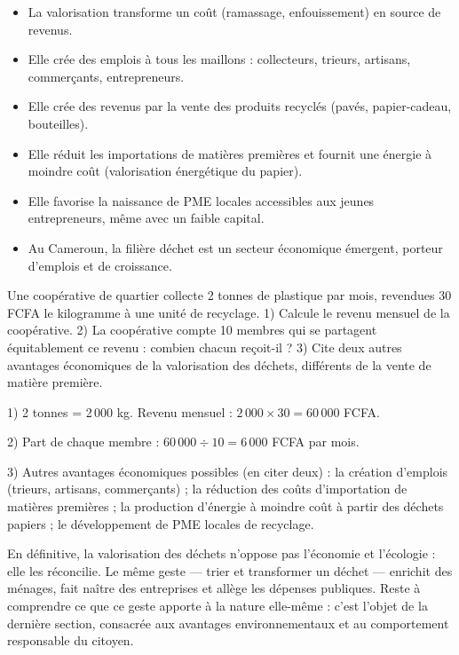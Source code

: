 \documentclass[11pt]{article}
\newcommand{\cle}[1]{{\popxbold\color{popdark}#1}}
\begin{document}
\begin{aretenir}
\begin{itemize}
\item La valorisation transforme un \cle{coût} (ramassage, enfouissement) en \cle{source de revenus}.
\item Elle crée des \cle{emplois} à tous les maillons : collecteurs, trieurs, artisans, commerçants, entrepreneurs.
\item Elle crée des \cle{revenus} par la vente des produits recyclés (pavés, papier-cadeau, bouteilles).
\item Elle réduit les \cle{importations} de matières premières et fournit une \cle{énergie à moindre coût} (valorisation énergétique du papier).
\item Elle favorise la naissance de \cle{PME locales} accessibles aux jeunes entrepreneurs, même avec un faible capital.
\item Au Cameroun, la filière déchet est un \cle{secteur économique émergent}, porteur d'emplois et de croissance.
\end{itemize}
\end{aretenir}

\begin{exercice}
Une coopérative de quartier collecte 2 tonnes de plastique par mois, revendues 30 FCFA le kilogramme à une unité de recyclage. 1) Calcule le revenu mensuel de la coopérative. 2) La coopérative compte 10 membres qui se partagent équitablement ce revenu : combien chacun reçoit-il ? 3) Cite deux autres avantages économiques de la valorisation des déchets, différents de la vente de matière première.
\end{exercice}

\begin{corrige}
1) 2 tonnes = 2\,000 kg. Revenu mensuel : $2\,000 \times 30 = 60\,000$ FCFA.

2) Part de chaque membre : $60\,000 \div 10 = 6\,000$ FCFA par mois.

3) Autres avantages économiques possibles (en citer deux) : la création d'emplois (trieurs, artisans, commerçants) ; la réduction des coûts d'importation de matières premières ; la production d'énergie à moindre coût à partir des déchets papiers ; le développement de PME locales de recyclage.
\end{corrige}

En définitive, la valorisation des déchets n'oppose pas l'économie et l'écologie : elle les réconcilie. Le même geste — trier et transformer un déchet — enrichit des ménages, fait naître des entreprises et allège les dépenses publiques. Reste à comprendre ce que ce geste apporte à la nature elle-même : c'est l'objet de la dernière section, consacrée aux avantages environnementaux et au comportement responsable du citoyen.
\end{document}
